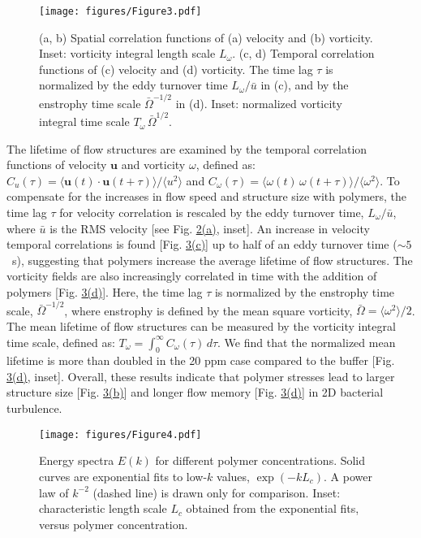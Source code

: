 \documentclass[aps,prl,floatfix,footinbib,twocolumn,superscriptaddress]{revtex4-1}
\begin{document}
\begin{figure}[b!]\label{fig3}
\centering
\texttt{[image: figures/Figure3.pdf]}
\caption{(a, b) Spatial correlation functions of (a) velocity and (b) vorticity. Inset: vorticity integral length scale $L_\omega$. (c, d) Temporal correlation functions of (c) velocity and (d) vorticity. The time lag $\tau$ is normalized by the eddy turnover time $L_\omega/\bar{u}$ in (c), and by the enstrophy time scale $\bar{\Omega}^{-1/2}$ in (d). Inset: normalized vorticity integral time scale $T_\omega\,\bar{\Omega}^{1/2}$.}
\end{figure}

The lifetime of flow structures are examined by the temporal correlation functions of velocity $\mathbf{u}$ and vorticity $\omega$, defined as: $C_u(\tau)=\langle\mathbf{u}(t)\cdotp\mathbf{u}(t+\tau)\rangle/\langle u^2\rangle$ and $C_\omega(\tau)=\langle\omega(t)\,\omega(t+\tau)\rangle/\langle \omega^2\rangle$. To compensate for the increases in flow speed and structure size with polymers, the time lag $\tau$ for velocity correlation is rescaled by the eddy turnover time, $L_\omega/\bar{u}$, where $\bar{u}$ is the RMS velocity [see Fig. \hyperref[fig2]{2(a)}, inset]. An increase in velocity temporal correlations is found [Fig. \hyperref[fig3]{3(c)}] up to half of an eddy turnover time ($\sim5$~s), suggesting that polymers increase the average lifetime of flow structures. The vorticity fields are also increasingly correlated in time with the addition of polymers [Fig. \hyperref[fig3]{3(d)}]. Here, the time lag $\tau$ is normalized by the enstrophy time scale, $\bar{\Omega}^{-1/2}$, where enstrophy is defined by the mean square vorticity, $\bar{\Omega}=\langle \omega^2\rangle/2$. The mean lifetime of flow structures can be measured by the vorticity integral time scale, defined as: $T_\omega=\int_0^\infty C_\omega(\tau)\,d\tau$. We find that the normalized mean lifetime is more than doubled in the 20 ppm case compared to the buffer [Fig. \hyperref[fig3]{3(d)}, inset]. Overall, these results indicate that polymer stresses lead to larger structure size [Fig. \hyperref[fig3]{3(b)}] and longer flow memory [Fig. \hyperref[fig3]{3(d)}] in 2D bacterial turbulence.

\begin{figure}[t!]\label{fig4}
\centering
\texttt{[image: figures/Figure4.pdf]}
\caption{Energy spectra $E(k)$ for different polymer concentrations. Solid curves are exponential fits to low-$k$ values, $\exp(-kL_c)$. A power law of $k^{-2}$ (dashed line) is drawn only for comparison. Inset: characteristic length scale $L_c$ obtained from the exponential fits, versus polymer concentration.}
\end{figure}
\end{document}
